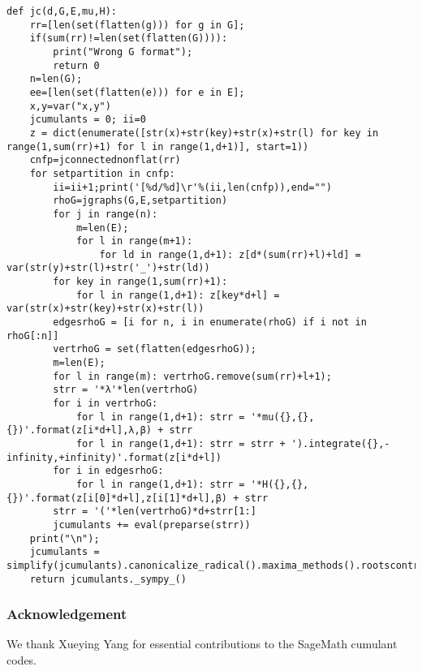 \documentclass[12pt]{article}
\numberwithin{equation}{section}
\begin{document}
\begin{lstlisting}
def jc(d,G,E,mu,H):
    rr=[len(set(flatten(g))) for g in G];
    if(sum(rr)!=len(set(flatten(G)))):
        print("Wrong G format");
        return 0
    n=len(G);
    ee=[len(set(flatten(e))) for e in E];
    x,y=var("x,y")
    jcumulants = 0; ii=0
    z = dict(enumerate([str(x)+str(key)+str(x)+str(l) for key in range(1,sum(rr)+1) for l in range(1,d+1)], start=1))
    cnfp=jconnectednonflat(rr)
    for setpartition in cnfp: 
        ii=ii+1;print('[%d/%d]\r'%(ii,len(cnfp)),end="")
        rhoG=jgraphs(G,E,setpartition)
        for j in range(n):
            m=len(E); 
            for l in range(m+1):
                for ld in range(1,d+1): z[d*(sum(rr)+l)+ld] = var(str(y)+str(l)+str('_')+str(ld))
        for key in range(1,sum(rr)+1): 
            for l in range(1,d+1): z[key*d+l] = var(str(x)+str(key)+str(x)+str(l))
        edgesrhoG = [i for n, i in enumerate(rhoG) if i not in rhoG[:n]]
        vertrhoG = set(flatten(edgesrhoG));
        m=len(E); 
        for l in range(m): vertrhoG.remove(sum(rr)+l+1);
        strr = '*λ'*len(vertrhoG)
        for i in vertrhoG:
            for l in range(1,d+1): strr = '*mu({},{},{})'.format(z[i*d+l],λ,β) + strr
            for l in range(1,d+1): strr = strr + ').integrate({},-infinity,+infinity)'.format(z[i*d+l])
        for i in edgesrhoG:
            for l in range(1,d+1): strr = '*H({},{},{})'.format(z[i[0]*d+l],z[i[1]*d+l],β) + strr
        strr = '('*len(vertrhoG)*d+strr[1:]
        jcumulants += eval(preparse(strr))
    print("\n");
    jcumulants = simplify(jcumulants).canonicalize_radical().maxima_methods().rootscontract().simplify()
    return jcumulants._sympy_()
\end{lstlisting} 



\subsubsection*{Acknowledgement}
\noindent
We thank Xueying Yang for essential contributions to the
SageMath cumulant codes. 

\footnotesize



% 
\end{document}
